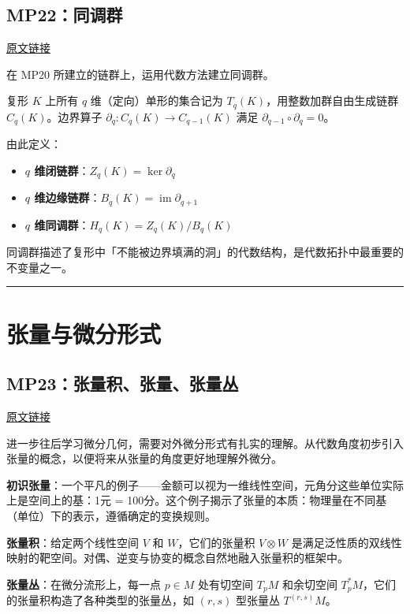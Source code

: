\documentclass[10pt, openany]{book}
\begin{document}
\section{MP22：同调群}
\label{sec:mp22}

\href{https://zhuanlan.zhihu.com/p/44776557}{原文链接}

在 MP20 所建立的链群上，运用代数方法建立同调群。

复形 $K$ 上所有 $q$ 维（定向）单形的集合记为 $T_q(K)$，用整数加群自由生成链群 $C_q(K)$。边界算子 $\partial_q: C_q(K) \to C_{q-1}(K)$ 满足 $\partial_{q-1} \circ \partial_q = 0$。

由此定义：
\begin{itemize}
    \item \textbf{$q$ 维闭链群}：$Z_q(K) = \ker \partial_q$
    \item \textbf{$q$ 维边缘链群}：$B_q(K) = \operatorname{im} \partial_{q+1}$
    \item \textbf{$q$ 维同调群}：$H_q(K) = Z_q(K) / B_q(K)$
\end{itemize}

同调群描述了复形中「不能被边界填满的洞」的代数结构，是代数拓扑中最重要的不变量之一。

\medskip
\noindent\rule{\textwidth}{0.4pt}

\chapter{张量与微分形式}

\section{MP23：张量积、张量、张量丛}
\label{sec:mp23}

\href{https://zhuanlan.zhihu.com/p/45703308}{原文链接}

进一步往后学习微分几何，需要对外微分形式有扎实的理解。从代数角度初步引入张量的概念，以便将来从张量的角度更好地理解外微分。

\textbf{初识张量}：一个平凡的例子——金额可以视为一维线性空间，元角分这些单位实际上是空间上的基：1元 = 100分。这个例子揭示了张量的本质：物理量在不同基（单位）下的表示，遵循确定的变换规则。

\textbf{张量积}：给定两个线性空间 $V$ 和 $W$，它们的张量积 $V \otimes W$ 是满足泛性质的双线性映射的靶空间。对偶、逆变与协变的概念自然地融入张量积的框架中。

\textbf{张量丛}：在微分流形上，每一点 $p \in M$ 处有切空间 $T_pM$ 和余切空间 $T_p^*M$，它们的张量积构造了各种类型的张量丛，如 $(r,s)$ 型张量丛 $T^{(r,s)}M$。
\end{document}
